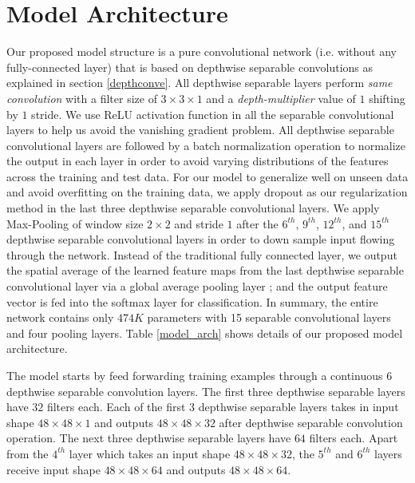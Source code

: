 \documentclass[master]{thesis-uestc}
\begin{document}
\section{Model Architecture}
Our proposed model structure is a pure convolutional network (i.e. without any fully-connected layer) that is based on depthwise separable convolutions as explained in section \ref{depthconve}. All depthwise separable layers perform \textit{same convolution} with a filter size of $3 \times 3 \times 1$ and a \textit{depth-multiplier} value of $1$ shifting by $1$ stride. We use ReLU\cite{7410480} activation function in all the separable convolutional layers to help us avoid the vanishing gradient problem\cite{5264952}. All depthwise separable convolutional layers are followed by a batch normalization \cite{DBLP:journals/corr/IoffeS15} operation to normalize the output in each layer in order to avoid varying distributions of the features across the training and test data. For our model to generalize well on unseen data and avoid overfitting on the training data, we apply dropout\cite{JMLR:v15:srivastava14a} as our regularization method in the last three depthwise separable convolutional layers. We apply Max-Pooling of window size $2 \times 2$ and stride $1$ after the $6^{th}$, $9^{th}$, $12^{th}$, and $15^{th}$ depthwise separable convolutional layers in order to down sample input flowing through the network. Instead of the traditional fully connected layer, we output the spatial average of the learned feature maps from the last depthwise separable convolutional layer via a global average pooling layer \cite{DBLP:journals/corr/LinCY13}; and the output feature vector is fed into the softmax layer for classification.  In summary, the entire network contains only $474K$ parameters with 15 separable convolutional layers and four pooling layers. Table \ref{model_arch} shows details of our proposed model architecture.

The model starts by feed forwarding training examples through a continuous $6$ depthwise separable convolution layers. The first three depthwise separable layers have $32$ filters each. Each of the first $3$ depthwise separable layers takes in input shape $48 \times 48 \times 1$ and outputs $48 \times 48 \times 32$ after depthwise separable convolution operation. The next three depthwise separable layers have $64$ filters each. Apart from the $4^{th}$ layer which takes an input shape $48 \times 48 \times 32$, the $5^{th}$ and $6^{th}$ layers receive input shape $48 \times 48 \times 64$ and outputs $48 \times 48 \times 64$.
\end{document}
